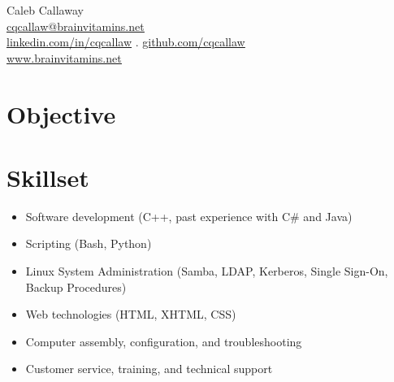 \documentclass{article}
\begin{document}
	\begin{center}
		{\Large Caleb Callaway}\\
		\href{mailto:cqcallaw@brainvitamins.net}{\ul{cqcallaw@brainvitamins.net}}\\
		\href{http://linkedin.com/in/cqcallaw/}{\ul{linkedin.com/in/cqcallaw}} . \href{https://github.com/cqcallaw/}{\ul{github.com/cqcallaw}}\\
		\href{https://www.brainvitamins.net/}{\ul{www.brainvitamins.net}}
	\end{center}

	\section*{Objective}

	\section*{Skillset}
	\begin{itemize}[label={}]
		\item Software development (C++, past experience with C\# and Java)
		\item Scripting (Bash, Python)
		\item Linux System Administration (Samba, LDAP, Kerberos, Single Sign-On, Backup Procedures)
		\item Web technologies (HTML, XHTML, CSS)
		\item Computer assembly, configuration, and troubleshooting
		\item Customer service, training, and technical support
	\end{itemize}
\end{document}
